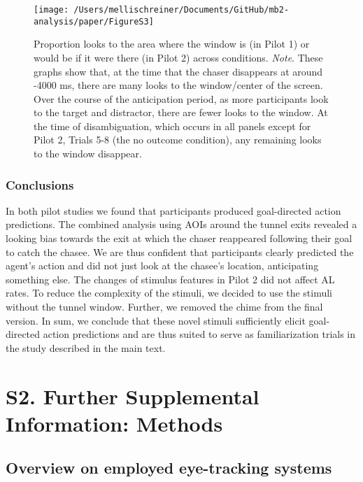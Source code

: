 \documentclass[
  man, donotrepeattitle,floatsintext]{apa6}
\begin{document}
\begin{figure}

\texttt{[image: /Users/mellischreiner/Documents/GitHub/mb2-analysis/paper/FigureS3]} \hfill{}

\caption{Proportion looks to the area where the window is (in Pilot 1) or would be if it were there (in Pilot 2) across conditions. \newline{} \textit{Note}. These graphs show that, at the time that the chaser disappears at around -4000 ms, there are many looks to the window/center of the screen. Over the course of the anticipation period, as more participants look to the target and distractor, there are fewer looks to the window. At the time of disambiguation, which occurs in all panels except for Pilot 2, Trials 5-8 (the no outcome condition), any remaining looks to the window disappear.}\label{fig:figS3}
\end{figure}

\subsubsection{Conclusions}\label{conclusions}

In both pilot studies we found that participants produced goal-directed action predictions. The combined analysis using AOIs around the tunnel exits revealed a looking bias towards the exit at which the chaser reappeared following their goal to catch the chasee. We are thus confident that participants clearly predicted the agent's action and did not just look at the chasee's location, anticipating something else. The changes of stimulus features in Pilot 2 did not affect AL rates. To reduce the complexity of the stimuli, we decided to use the stimuli without the tunnel window. Further, we removed the chime from the final version. In sum, we conclude that these novel stimuli sufficiently elicit goal-directed action predictions and are thus suited to serve as familiarization trials in the study described in the main text.

\section{S2. Further Supplemental Information: Methods}\label{s2.-further-supplemental-information-methods}

\subsection{Overview on employed eye-tracking systems}\label{overview-on-employed-eye-tracking-systems}
\end{document}
